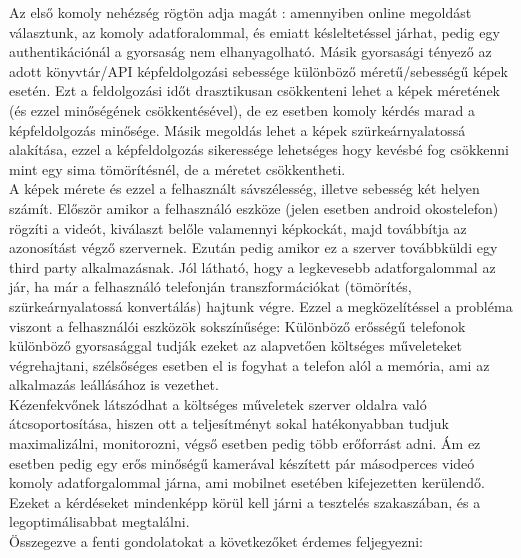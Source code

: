 Az első komoly nehézség rögtön adja magát : amennyiben online megoldást választunk, az komoly adatforalommal, és emiatt késleltetéssel járhat, pedig egy authentikációnál a gyorsaság nem elhanyagolható. Másik gyorsasági tényező az adott könyvtár/API képfeldolgozási sebessége különböző méretű/sebességű képek esetén. Ezt a feldolgozási időt drasztikusan csökkenteni lehet a képek méretének (és ezzel minőségének csökkentésével), de ez esetben komoly kérdés marad a képfeldolgozás minősége. Másik megoldás lehet a képek szürkeárnyalatossá alakítása, ezzel a képfeldolgozás sikeressége lehetséges hogy kevésbé fog csökkenni mint egy sima tömörítésnél, de a méretet csökkentheti.
\\A képek mérete és ezzel a felhasznált sávszélesség, illetve sebesség két helyen számít. Először amikor a felhasználó eszköze (jelen esetben android okostelefon) rögzíti a videót, kiválaszt belőle valamennyi képkockát, majd továbbítja az azonosítást végző szervernek. Ezután pedig amikor ez a szerver továbbküldi egy third party alkalmazásnak. Jól látható, hogy a legkevesebb adatforgalommal az jár, ha már a felhasználó telefonján transzformációkat (tömörítés, szürkeárnyalatossá konvertálás) hajtunk végre. Ezzel a megközelítéssel a probléma viszont a felhasználói eszközök sokszínűsége: Különböző erősségű telefonok különböző gyorsasággal tudják ezeket az alapvetően költséges műveleteket végrehajtani, szélsőséges esetben el is fogyhat a telefon alól a memória, ami az alkalmazás leállásához is vezethet.
\\Kézenfekvőnek látszódhat a költséges műveletek szerver oldalra való átcsoportosítása, hiszen ott a teljesítményt sokal hatékonyabban tudjuk maximalizálni, monitorozni, végső esetben pedig több erőforrást adni. Ám ez esetben pedig egy erős minőségű kamerával készített pár másodperces videó komoly adatforgalommal járna, ami mobilnet esetében kifejezetten kerülendő.
Ezeket a kérdéseket mindenképp körül kell járni a tesztelés szakaszában, és a legoptimálisabbat megtalálni.
\\Összegezve  a fenti gondolatokat a következőket érdemes feljegyezni:


